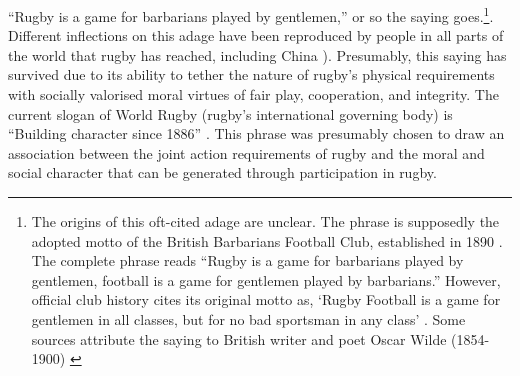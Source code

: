 \begin{CJK}{UTF8}{gbsn}
``Rugby is a game for barbarians played by gentlemen,'' or so the saying goes.\footnote{The origins of this oft-cited adage are unclear.  The phrase is supposedly the adopted motto of the British Barbarians Football Club, established in 1890 \citep[34]{Dunning2005}.  The complete phrase reads ``Rugby is a game for barbarians played by gentlemen, football is a game for gentlemen played by barbarians.''  However, official club history cites its original motto as, ‘Rugby Football is a game for gentlemen in all classes, but for no bad sportsman in any class' \citep[vii]{Starmer-Smith1977}.  Some sources attribute the saying to British writer and poet Oscar Wilde (1854-1900) \citep{Fleenor2015}}. Different inflections on this adage have been reproduced by people in all parts of the world that rugby has reached, including China \citep[see][]{Taylor2010}).  Presumably, this saying has survived due to its ability to tether the nature of rugby's physical requirements with socially valorised moral virtues of fair play, cooperation, and integrity.  The current slogan of World Rugby (rugby's international governing body) is ``Building character since 1886'' \citep{WorldRugby2017}.  This phrase was presumably chosen to draw an association between the joint action requirements of rugby and the moral and social character that can be generated through participation in rugby.


\end{CJK}
